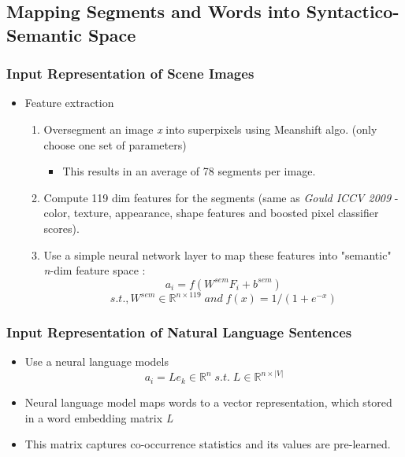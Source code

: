 \documentclass{beamer}
\begin{document}
\subsection{Mapping Segments and Words into Syntactico-Semantic Space}
\frame
{
	\frametitle{Input Representation of Scene Images}
	\begin{itemize}
		\item Feature extraction
			\begin{enumerate}
				\item Oversegment an image \textit{x} into superpixels using Meanshift algo. (only choose one set of parameters)
					\begin{itemize}
					\item This results in an average of 78 segments per image. 
					\end{itemize}
				\item Compute 119 dim features for the segments (same as \textit{Gould ICCV 2009} - color, texture, appearance, shape  features and boosted pixel classifier scores).
				\item Use a simple neural network layer to map these features into "semantic" \textit{n}-dim feature space :
				$$ a_i = f(W^{\textit{sem}}F_i+b^{sem}) $$ 
				$$ s.t., W^{sem} \in \mathbb{R}^{n\times119} \;and\; f(x)=1/(1+e^{-x})$$
			\end{enumerate}
	\end{itemize}
}
\frame
{
	\frametitle{Input Representation of Natural Language Sentences}
	\begin{itemize}
		\item Use a neural language models
		$$ a_i = Le_k \in \mathbb{R}^n \; s.t. \; L \in \mathbb{R}^{n\times|V|} $$
		\item Neural language model maps words to a vector representation, which stored in a word embedding matrix \textit{L}
		\item This matrix captures co-occurrence statistics and its values are pre-learned. 
	\end{itemize}
}
\end{document}
